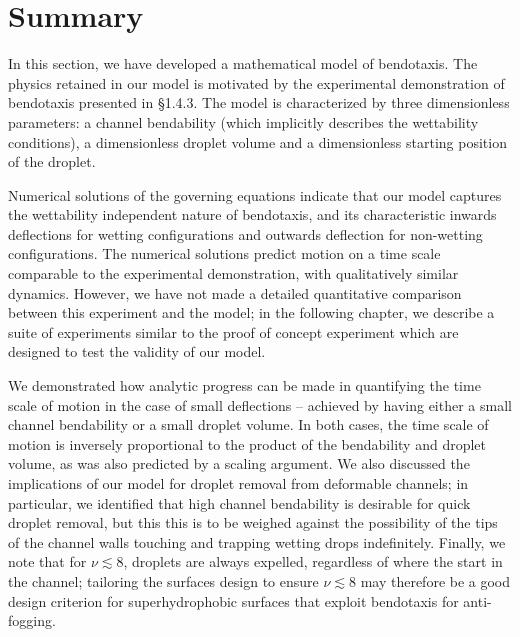 \section{Summary}
In this section, we have developed a mathematical model of bendotaxis. The physics retained in our model is motivated by the experimental demonstration of bendotaxis presented in \S1.4.3. The model is characterized by three dimensionless parameters: a channel bendability (which implicitly describes the wettability conditions), a dimensionless droplet volume and a dimensionless starting position of the droplet.

Numerical solutions of the governing equations indicate that our model captures the wettability independent nature of bendotaxis, and its characteristic inwards deflections for wetting configurations and outwards deflection for non-wetting configurations. The numerical solutions predict motion on a time scale comparable to the experimental demonstration, with qualitatively similar dynamics. However, we have not made a detailed quantitative comparison between this experiment and the model; in the following chapter, we describe a suite of experiments similar to the proof of concept experiment which are designed to test the validity of our model.

We demonstrated how analytic progress can be made in quantifying the time scale of motion in the case of small deflections -- achieved by having either a small channel bendability or a small droplet volume. In both cases, the time scale of motion is inversely proportional to the product of the bendability and droplet volume, as was also predicted by a scaling argument. We also discussed the implications of our model for droplet removal from deformable channels; in particular, we identified that high channel bendability is desirable for quick droplet removal, but this this is to be weighed against the possibility of the tips of the channel walls touching and trapping wetting drops indefinitely. Finally, we note that for $\nu \lesssim 8$, droplets are always expelled, regardless of where the start in the channel; tailoring the surfaces design to ensure $\nu \lesssim 8$ may therefore be a good design criterion for superhydrophobic surfaces that exploit bendotaxis for anti-fogging.


